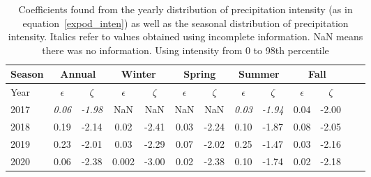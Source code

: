 \begin{table}[htb]
  \begin{center}
    \begin{tabular}{|l|*{11}{c|}r|}
      \hline
      Season    &       \multicolumn{2}{|c|}{Annual}          & \multicolumn{2}{|c|}{Winter}& \multicolumn{2}{|c|}{Spring}  & \multicolumn{2}{|c|}{Summer} &\multicolumn{2}{|c|}{Fall}  \\
      \hline
      Year      & $\epsilon $ & $\zeta$  &  $\epsilon $ & $\zeta$  &  $\epsilon $ & $\zeta$  &  $\epsilon $ & $\zeta$  & $\epsilon $ & $\zeta$ \\
      \hline
      2017      & \textit{0.06}  & \textit{-1.98}  & NaN & NaN & NaN & NaN & \textit{0.03}  & \textit{-1.94}  & 0.04  & -2.00  \\
      2018      & 0.19           & -2.14  & 0.02 & -2.41 & 0.03 & -2.24  & 0.10  & -1.87  & 0.08 & -2.05  \\
      2019      & 0.23           & -2.01  & 0.03 & -2.29 & 0.07 & -2.02 & 0.25 & -1.47 & 0.03 & -2.16  \\
      2020      & 0.06          & -2.38  & 0.002 & -3.00 & 0.02 & -2.38 & 0.10  & -1.74 & 0.02 & -2.18\\
      \hline
    \end{tabular}
  \end{center}
  \caption[Year comparison of coefficients for precipitation intensity up to its
    98th percentile] {\label{fourthtable}Coefficients found from the yearly
    distribution of precipitation intensity (as in
    equation~\ref{expod_inten}) as well as the seasonal distribution of
    precipitation intensity. Italics refer to values obtained using
    incomplete information. NaN means there was no information. Using
    intensity from 0 to 98th percentile}
\end{table}
